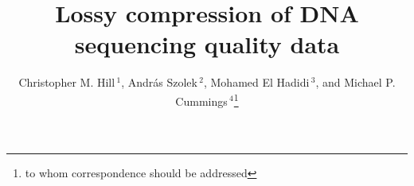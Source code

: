 \documentclass{bioinfo}
\begin{document}

\title[lossy-compression]{Lossy compression of DNA sequencing quality
  data} \author[Hill \textit{et~al.}]{Christopher
  M. Hill\,$^{1}$, Andr\'{a}s Szolek\,$^{2}$, Mohamed El
  Hadidi\,$^{3}$, and Michael P. Cummings\,$^4$\footnote{to whom correspondence should be
    addressed}} \address{$^{1}$Department of Computer Science, University of Maryland,
  College Park, Maryland, 20742 USA\\ $^{2}$Department of Applied
  Bioinformatics, Center for Bioinformatics, Quantitative Biology
  Center, and Department of Computer Science, University of
  T\"{u}bingen, Sand 14, 72076 T\"{u}bingen, Germany\\ 
  $^{3}$Department of Algorithms in
  Bioinformatics, Center for Bioinformatics, University of
  T\"{u}bingen, Sand 14, 72076 T\"{u}bingen, Germany
  \\ $^{4}$ Center for Bioinformatics and Computational Biology, University of
  Maryland, College Park, Maryland, 20742 USA}

\maketitle
\end{document}
